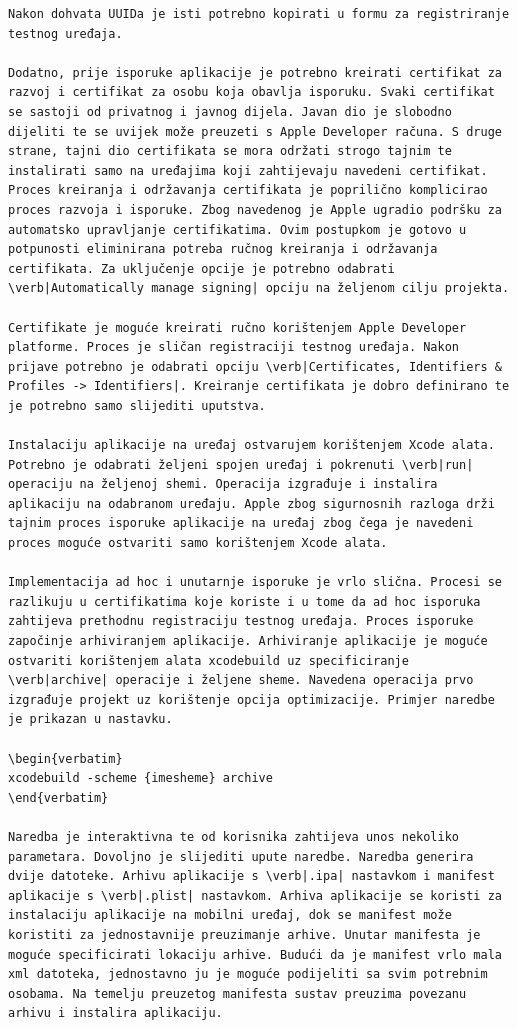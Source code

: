 \documentclass[times, utf8, diplomski, numeric]{fer}
\begin{document}
\begin{appendices}
\begin{lstlisting}[caption=Provjera postojanja i pokretanje Swiftlint alata, label=listing:swiftlint]
Nakon dohvata UUIDa je isti potrebno kopirati u formu za registriranje testnog uređaja.

Dodatno, prije isporuke aplikacije je potrebno kreirati certifikat za razvoj i certifikat za osobu koja obavlja isporuku. Svaki certifikat se sastoji od privatnog i javnog dijela. Javan dio je slobodno dijeliti te se uvijek može preuzeti s Apple Developer računa. S druge strane, tajni dio certifikata se mora održati strogo tajnim te instalirati samo na uređajima koji zahtijevaju navedeni certifikat. Proces kreiranja i održavanja certifikata je poprilično komplicirao proces razvoja i isporuke. Zbog navedenog je Apple ugradio podršku za automatsko upravljanje certifikatima. Ovim postupkom je gotovo u potpunosti eliminirana potreba ručnog kreiranja i održavanja certifikata. Za uključenje opcije je potrebno odabrati \verb|Automatically manage signing| opciju na željenom cilju projekta.

Certifikate je moguće kreirati ručno korištenjem Apple Developer platforme. Proces je sličan registraciji testnog uređaja. Nakon prijave potrebno je odabrati opciju \verb|Certificates, Identifiers & Profiles -> Identifiers|. Kreiranje certifikata je dobro definirano te je potrebno samo slijediti uputstva.

Instalaciju aplikacije na uređaj ostvarujem korištenjem Xcode alata. Potrebno je odabrati željeni spojen uređaj i pokrenuti \verb|run| operaciju na željenoj shemi. Operacija izgrađuje i instalira aplikaciju na odabranom uređaju. Apple zbog sigurnosnih razloga drži tajnim proces isporuke aplikacije na uređaj zbog čega je navedeni proces moguće ostvariti samo korištenjem Xcode alata.

Implementacija ad hoc i unutarnje isporuke je vrlo slična. Procesi se razlikuju u certifikatima koje koriste i u tome da ad hoc isporuka zahtijeva prethodnu registraciju testnog uređaja. Proces isporuke započinje arhiviranjem aplikacije. Arhiviranje aplikacije je moguće ostvariti korištenjem alata xcodebuild uz specificiranje \verb|archive| operacije i željene sheme. Navedena operacija prvo izgrađuje projekt uz korištenje opcija optimizacije. Primjer naredbe je prikazan u nastavku.

\begin{verbatim}
xcodebuild -scheme {imesheme} archive
\end{verbatim}

Naredba je interaktivna te od korisnika zahtijeva unos nekoliko parametara. Dovoljno je slijediti upute naredbe. Naredba generira dvije datoteke. Arhivu aplikacije s \verb|.ipa| nastavkom i manifest aplikacije s \verb|.plist| nastavkom. Arhiva aplikacije se koristi za instalaciju aplikacije na mobilni uređaj, dok se manifest može koristiti za jednostavnije preuzimanje arhive. Unutar manifesta je moguće specificirati lokaciju arhive. Budući da je manifest vrlo mala xml datoteka, jednostavno ju je moguće podijeliti sa svim potrebnim osobama. Na temelju preuzetog manifesta sustav preuzima povezanu arhivu i instalira aplikaciju.


\end{lstlisting}
\end{appendices}
\end{document}
